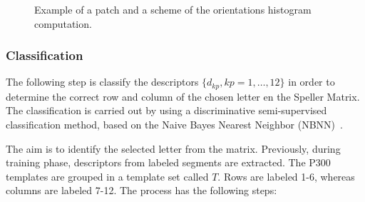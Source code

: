 \documentclass[entropy,article,submit,moreauthors,pdftex,10pt,a4paper]{mdpi}
\begin{document}
 
\begin{figure}[H]
\centering
{}
\caption{ Example of a patch and a scheme of the orientations histogram computation.}
\label{fig:sampledescriptor}
\end{figure}

\subsubsection{Classification}
\label{Classification}

The following step is classify the descriptors $\{d_{kp}, kp =1,\dots, 12\}$ in order to determine the correct row and column of the chosen letter en the Speller Matrix.   The classification is carried out by using a discriminative semi-supervised classification method, based on the Naive Bayes Nearest Neighbor (NBNN)~\citep{Boiman2008}.

The aim is to identify the selected letter from the matrix. Previously, during training phase, descriptors from labeled segments are extracted.  The P300 templates are grouped in a template set called $ T $.  Rows are labeled 1-6, whereas columns are labeled 7-12.  The process has the following steps:
\end{document}
